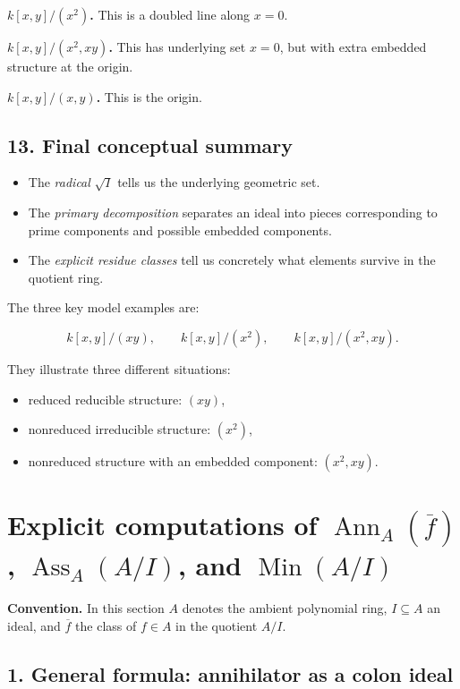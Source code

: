 \documentclass[12pt,a4paper]{article}
\theoremstyle{notespace}
\DeclareMathOperator{\Ass}{Ass}
\DeclareMathOperator{\Ann}{Ann}
\DeclareMathOperator{\Min}{Min}
\begin{document}
\textbf{\(k[x,y]/(x^2)\).}
This is a doubled line along \(x=0\).

\textbf{\(k[x,y]/(x^2,xy)\).}
This has underlying set \(x=0\), but with extra embedded structure at the origin.

\textbf{\(k[x,y]/(x,y)\).}
This is the origin.

\subsection{13. Final conceptual summary}

\begin{itemize}
	\item The \emph{radical} \(\sqrt I\) tells us the underlying geometric set.
	\item The \emph{primary decomposition} separates an ideal into pieces corresponding to prime components and possible embedded components.
	\item The \emph{explicit residue classes} tell us concretely what elements survive in the quotient ring.
\end{itemize}

The three key model examples are:

\[
k[x,y]/(xy),\qquad k[x,y]/(x^2),\qquad k[x,y]/(x^2,xy).
\]

They illustrate three different situations:

\begin{itemize}
	\item reduced reducible structure: \((xy)\),
	\item nonreduced irreducible structure: \((x^2)\),
	\item nonreduced structure with an embedded component: \((x^2,xy)\).
\end{itemize}

\section{Explicit computations of \(\Ann_A(\overline f)\), \(\Ass_A(A/I)\), and \(\Min(A/I)\)}

\textbf{Convention.}
In this section \(A\) denotes the ambient polynomial ring, \(I\subseteq A\) an ideal, and \(\overline f\) the class of \(f\in A\) in the quotient \(A/I\).

\subsection{1. General formula: annihilator as a colon ideal}
\end{document}
